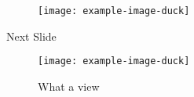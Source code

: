 \documentclass{beamer}
\begin{document}
\begin{frame}
\begin{figure}[htbp]
    \texttt{[image: example-image-duck]}
    \addtocounter{figure}{1}
\end{figure}
\end{frame}

\begin{frame}
    Next Slide
\begin{figure}[htbp]
    \texttt{[image: example-image-duck]}
    \caption{What a view}
\end{figure}
\end{frame}
\end{document}
